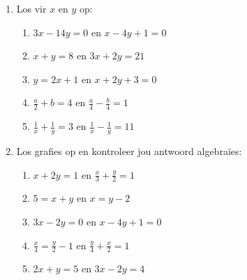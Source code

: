 \begin{exercises}{}
{

\begin{enumerate}[noitemsep, label=\textbf{\arabic*}. ] 
\item Los vir $x$ en $y$ op: 
\begin{enumerate}[noitemsep, label=\textbf{(\alph*)} ] 
\item $3x-14y=0$ en $x-4y+1=0$
\item $x+y=8$ en $3x + 2y = 21$
\item $y=2x+1$ en $x + 2y + 3 = 0$
\item $\frac{a}{2}+b=4$ en $\frac{a}{4} -\frac{b}{4}=1$
\item $\frac{1}{x}+\frac{1}{y}=3$ en $\frac{1}{x}-\frac{1}{y}=11$
\end{enumerate}
\item Los grafies op en kontroleer jou antwoord algebraïes:
\begin{enumerate}[noitemsep, label=\textbf{(\alph*)} ] 
\item  $x+2y=1$ en $\frac{x}{3} + \frac{y}{2} = 1$
\item $5= x+y$ en $x = y-2$
\item $3x - 2y = 0$ en $x - 4y + 1 = 0$
\item $\frac{x}{4}=\frac{y}{2}-1$  en $\frac{y}{4}+\frac{x}{2}=1$
\item $2x+y=5$ en $3x-2y=4$
\end{enumerate}
\end{enumerate}

}
\end{exercises}


